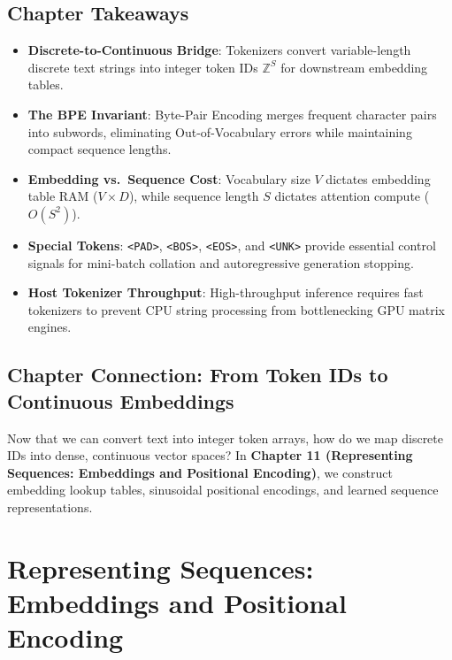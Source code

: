 \documentclass[
  letterpaper,
]{scrbook}
\providecommand{\tightlist}{%
  \setlength{\itemsep}{0pt}\setlength{\parskip}{0pt}}
\begin{document}
\section{Chapter Takeaways}\label{chapter-takeaways-10}

\begin{itemize}
\tightlist
\item
  \textbf{Discrete-to-Continuous Bridge}: Tokenizers convert
  variable-length discrete text strings into integer token IDs
  \(\mathbb{Z}^S\) for downstream embedding tables.
\item
  \textbf{The BPE Invariant}: Byte-Pair Encoding merges frequent
  character pairs into subwords, eliminating Out-of-Vocabulary errors
  while maintaining compact sequence lengths.
\item
  \textbf{Embedding vs.~Sequence Cost}: Vocabulary size \(V\) dictates
  embedding table RAM (\(V \times D\)), while sequence length \(S\)
  dictates attention compute (\(O(S^2)\)).
\item
  \textbf{Special Tokens}: \texttt{\textless{}PAD\textgreater{}},
  \texttt{\textless{}BOS\textgreater{}},
  \texttt{\textless{}EOS\textgreater{}}, and
  \texttt{\textless{}UNK\textgreater{}} provide essential control
  signals for mini-batch collation and autoregressive generation
  stopping.
\item
  \textbf{Host Tokenizer Throughput}: High-throughput inference requires
  fast tokenizers to prevent CPU string processing from bottlenecking
  GPU matrix engines.
\end{itemize}

\section{Chapter Connection: From Token IDs to Continuous
Embeddings}\label{chapter-connection-from-token-ids-to-continuous-embeddings}

Now that we can convert text into integer token arrays, how do we map
discrete IDs into dense, continuous vector spaces? In \textbf{Chapter 11
(Representing Sequences: Embeddings and Positional Encoding)}, we
construct embedding lookup tables, sinusoidal positional encodings, and
learned sequence representations.

\chapter{Representing Sequences: Embeddings and Positional
Encoding}\label{representing-sequences-embeddings-and-positional-encoding}
\end{document}
